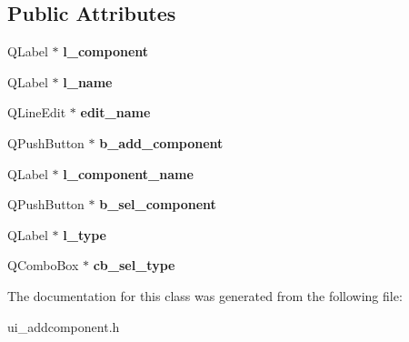 \subsection*{Public Attributes}
\begin{DoxyCompactItemize}
\item 
\hypertarget{classUi__AddComponent_a3cec23b1fba8f525d03c48a22448189a}{Q\-Label $\ast$ {\bfseries l\-\_\-component}}\label{classUi__AddComponent_a3cec23b1fba8f525d03c48a22448189a}

\item 
\hypertarget{classUi__AddComponent_acbec0d71905737fab6c80a9e56f0414b}{Q\-Label $\ast$ {\bfseries l\-\_\-name}}\label{classUi__AddComponent_acbec0d71905737fab6c80a9e56f0414b}

\item 
\hypertarget{classUi__AddComponent_aa0038af0f41796d9978d32b77bda5008}{Q\-Line\-Edit $\ast$ {\bfseries edit\-\_\-name}}\label{classUi__AddComponent_aa0038af0f41796d9978d32b77bda5008}

\item 
\hypertarget{classUi__AddComponent_a563ee038186eda630b1c450481573a5b}{Q\-Push\-Button $\ast$ {\bfseries b\-\_\-add\-\_\-component}}\label{classUi__AddComponent_a563ee038186eda630b1c450481573a5b}

\item 
\hypertarget{classUi__AddComponent_ae9ff754bad272c80ceb80fce907bdddc}{Q\-Label $\ast$ {\bfseries l\-\_\-component\-\_\-name}}\label{classUi__AddComponent_ae9ff754bad272c80ceb80fce907bdddc}

\item 
\hypertarget{classUi__AddComponent_a57e17717b4eab4e2158171b50a17be12}{Q\-Push\-Button $\ast$ {\bfseries b\-\_\-sel\-\_\-component}}\label{classUi__AddComponent_a57e17717b4eab4e2158171b50a17be12}

\item 
\hypertarget{classUi__AddComponent_a6b03c43980b6ffdc8cd638a63c13ee66}{Q\-Label $\ast$ {\bfseries l\-\_\-type}}\label{classUi__AddComponent_a6b03c43980b6ffdc8cd638a63c13ee66}

\item 
\hypertarget{classUi__AddComponent_a3407ea1f66fdff7d2d5ad7f1e111b2c3}{Q\-Combo\-Box $\ast$ {\bfseries cb\-\_\-sel\-\_\-type}}\label{classUi__AddComponent_a3407ea1f66fdff7d2d5ad7f1e111b2c3}

\end{DoxyCompactItemize}


The documentation for this class was generated from the following file\-:\begin{DoxyCompactItemize}
\item 
ui\-\_\-addcomponent.\-h\end{DoxyCompactItemize}
